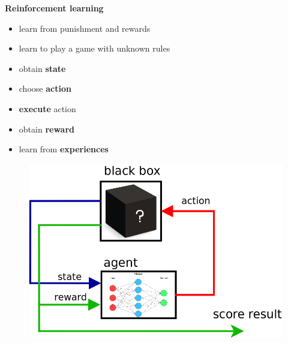 \documentclass[xcolor=dvipsnames]{beamer}
\begin{document}
\begin{frame}{\bf Reinforcement learning}

\begin{itemize}
  \item learn from punishment and rewards
  \item learn to play a game with unknown rules
\end{itemize}

\begin{itemize}
  \item obtain {\bf state}
  \item choose {\bf action}
  \item {\bf execute} action
  \item obtain {\bf reward}
  \item learn from {\bf experiences}
\end{itemize}

  \begin{figure}
    \includegraphics[scale=0.3]{../../diagrams/rl_mechanism.png}
  \end{figure}

\end{frame}
\end{document}
